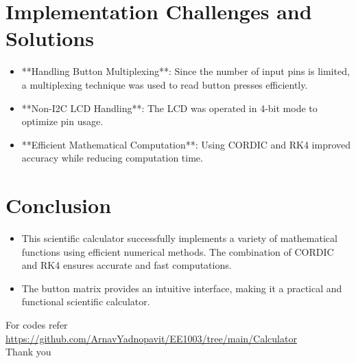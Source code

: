 \documentclass[a4paper,12pt]{article}
\begin{document}
\section{Implementation Challenges and Solutions}
\begin{itemize}
    \item **Handling Button Multiplexing**: Since the number of input pins is limited, a multiplexing technique was used to read button presses efficiently.
    \item **Non-I2C LCD Handling**: The LCD was operated in 4-bit mode to optimize pin usage.
    \item **Efficient Mathematical Computation**: Using CORDIC and RK4 improved accuracy while reducing computation time.
\end{itemize}

\section{Conclusion}
\begin{itemize}
    \item This scientific calculator successfully implements a variety of mathematical functions using efficient numerical methods. The combination of CORDIC and RK4 ensures accurate and fast computations.
    \item The button matrix provides an intuitive interface, making it a practical and functional scientific calculator.
\end{itemize}
For codes refer\\
\url{https://github.com/ArnavYadnopavit/EE1003/tree/main/Calculator}\\

\centering
Thank you
\end{document}
